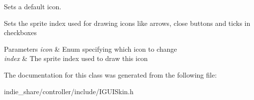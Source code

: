 Sets a default icon. 

Sets the sprite index used for drawing icons like arrows, close buttons and ticks in checkboxes 
\begin{DoxyParams}{Parameters}
{\em icon} & Enum specifying which icon to change \\
\hline
{\em index} & The sprite index used to draw this icon \\
\hline
\end{DoxyParams}


The documentation for this class was generated from the following file\+:\begin{DoxyCompactItemize}
\item 
indie\+\_\+share/controller/include/I\+G\+U\+I\+Skin.\+h\end{DoxyCompactItemize}
